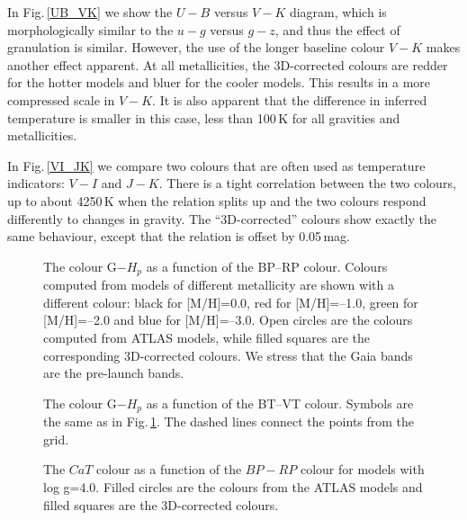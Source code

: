 \documentclass[]{aa}
\begin{document}
In Fig.\,\ref{UB_VK} we show the $U-B$ versus $V-K$ diagram, which is
morphologically similar to the  $u-g$ versus $g-z$, 
and thus the effect of granulation is similar.
However, the use of the longer baseline colour $V-K$ makes another
effect apparent. At all metallicities, the 3D-corrected colours
are redder for the hotter models and bluer for the cooler
models. This results in a more compressed scale in $V-K$. 
It is also apparent that the difference in inferred temperature
is smaller in this case, less than 100\,K for all gravities and
metallicities. 

In Fig.\,\ref{VI_JK} we compare two colours that are often used
as temperature indicators: $V-I$ and $J-K$.
There is a tight correlation between the two colours, up to about 
4250\,K when the relation splits up and the two colours respond
differently to changes in gravity. The ``3D-corrected'' colours show exactly the
same behaviour, except that the relation is offset by 0.05\,mag.


\begin{figure}
\centering
{}
\caption{The colour G$-H_p$ as a function of the BP--RP colour.  
Colours computed from models of different metallicity are shown with 
a different colour: black for [M/H]=0.0, red for [M/H]=--1.0,
green for [M/H]=--2.0 and blue for [M/H]=--3.0.
Open circles are the colours computed from ATLAS models, while filled squares
are the corresponding 3D-corrected colours. 
We stress that the Gaia bands are the pre-launch bands.
\label{GHP}}
\end{figure}

\begin{figure}
\centering
{}
\caption{The colour G$-H_p$ as a function of the BT--VT colour. Symbols
are the same as in Fig.\,\ref{GHP}. 
The dashed lines connect the points from the \citet{CK03} grid.
\label{GHPBTVT}}
\end{figure}

\begin{figure}
\centering
{}
\caption{The $CaT$ colour  as a function of the $BP-RP$ colour for models
with log g=4.0. Filled circles are the colours from the ATLAS models and
filled squares are the 3D-corrected colours.  
\label{Ca}}
\end{figure}
\end{document}
